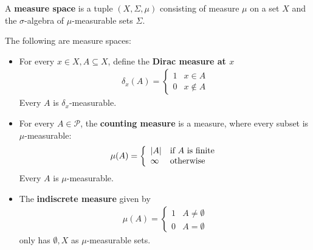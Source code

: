 \begin{dfn}[]
  A \textbf{measure space} is a tuple $(X, \Sigma, \mu)$ consisting of measure $\mu$ on a set $X$ and the $\sigma$-algebra of $\mu$-measurable sets $\Sigma$.
\end{dfn}


\begin{ex}[]
  The following are measure spaces:
  \begin{itemize}
    \item For every $x \in X, A \subseteq X$, define the \textbf{Dirac measure at $x$}
      \begin{align*}
        \delta_x(A) =\left\{\begin{array}{ll}
            1 & x \in A \\
            0 & x \notin A
        \end{array} \right.
      \end{align*}
      Every $A$ is $\delta_x$-measurable.
    \item For every $A \in \mathcal{P}$, the \textbf{counting measure} is a measure, where every subset is $\mu$-measurable:
      \begin{align*}
        \mu(A) = \left\{\begin{array}{ll}
            \vert A\vert & \text{if $A$ is finite} \\
           \infty & \text{otherwise}
        \end{array} \right.
      \end{align*}
      Every $A$ is $\mu$-measurable.
    \item The \textbf{indiscrete measure} given by
      \begin{align*}
        \mu(A) = \left\{\begin{array}{ll}
          1 & A \neq \emptyset \\
          0 & A = \emptyset
        \end{array} \right.
      \end{align*}
      only has $\emptyset,X$ as $\mu$-measurable sets.
  \end{itemize}
\end{ex}

